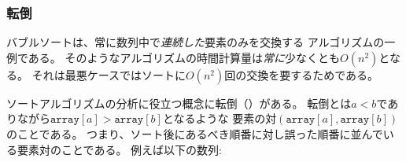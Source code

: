 \begin{comment}
\subsubsection{Inversions}

\index{inversion}

Bubble sort is an example of a sorting
algorithm that always swaps \emph{consecutive}
elements in the array.
It turns out that the time complexity
of such an algorithm is \emph{always}
at least $O(n^2)$, because in the worst case,
$O(n^2)$ swaps are required for sorting the array.

A useful concept when analyzing sorting
algorithms is an \key{inversion}:
a pair of array elements
$(\texttt{array}[a],\texttt{array}[b])$ such that
$a<b$ and $\texttt{array}[a]>\texttt{array}[b]$,
i.e., the elements are in the wrong order.
For example, the array
\end{comment}

\subsubsection{転倒}


バブルソートは、常に数列中で\emph{連続した}要素のみを交換する
アルゴリズムの一例である。
そのようなアルゴリズムの時間計算量は\emph{常に}少なくとも$O(n^2)$となる。
それは最悪ケースではソートに$O(n^2)$回の交換を要するためである。

ソートアルゴリズムの分析に役立つ概念に転倒（）がある。
転倒とは$a<b$でありながら$\texttt{array}[a]>\texttt{array}[b]$となるような
要素の対$(\texttt{array}[a],\texttt{array}[b])$のことである。
つまり、ソート後にあるべき順番に対し誤った順番に並んでいる要素対のことである。
例えば以下の数列:

\begin{center}
\end{center}

\begin{comment}
has three inversions: $(6,3)$, $(6,5)$ and $(9,8)$.
The number of inversions indicates
how much work is needed to sort the array.
An array is completely sorted when
there are no inversions.
On the other hand, if the array elements
are in the reverse order,
the number of inversions is the largest possible:
\[1+2+\cdots+(n-1)=\frac{n(n-1)}{2} = O(n^2)\]

Swapping a pair of consecutive elements that are
in the wrong order removes exactly one inversion
from the array.
Hence, if a sorting algorithm can only
swap consecutive elements, each swap removes
at most one inversion, and the time complexity
of the algorithm is at least $O(n^2)$.
\end{comment}

